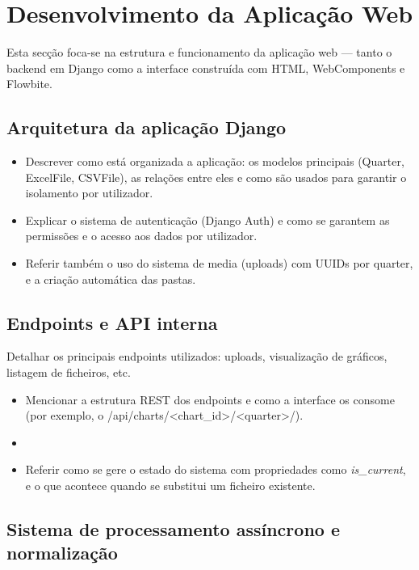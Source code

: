 \section{Desenvolvimento da Aplicação Web}

Esta secção foca-se na estrutura e funcionamento da aplicação web — tanto o backend em Django como a interface construída com HTML, WebComponents e Flowbite.
\subsection{Arquitetura da aplicação Django}

    \begin{itemize}
        \item Descrever como está organizada a aplicação: os modelos principais (Quarter, ExcelFile, CSVFile), as relações entre eles e como são usados para garantir o isolamento por utilizador.
        \item Explicar o sistema de autenticação (Django Auth) e como se garantem as permissões e o acesso aos dados por utilizador.
        \item Referir também o uso do sistema de media (uploads) com UUIDs por quarter, e a criação automática das pastas.
    \end{itemize}

\subsection{Endpoints e API interna}

    Detalhar os principais endpoints utilizados: uploads, visualização de gráficos, listagem de ficheiros, etc.

    \begin{itemize}
        \item Mencionar a estrutura REST dos endpoints e como a interface os consome (por exemplo, o /api/charts/<chart_id>/<quarter>/).
        \item 
        \item Referir como se gere o estado do sistema com propriedades como \textit{is_current}, e o que acontece quando se substitui um ficheiro existente.
    \end{itemize}

\subsection{Sistema de processamento assíncrono e normalização}

